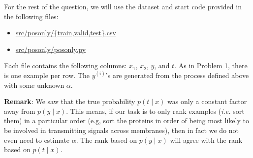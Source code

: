 For the rest of the question, we will use the dataset and start code provided in
the following files:
%
\begin{center}
\begin{itemize}
\item	\url{src/posonly/{train,valid,test}.csv}
\item   \url{src/posonly/posonly.py}
\end{itemize}
\end{center}
%
Each file contains the following columns: $x_1$, $x_2$, $y$, and $t$. As in
Problem 1, there is one example per row. The $y^{(i)}$'s are generated from the process defined above with some unknown $\alpha$.


\begin{enumerate}
        
        \ifnum{} {
	  
        }\fi

        
        \ifnum{} {
	  
        } \fi

        
        \ifnum{} {
	  
        } \fi

	
        \ifnum{} {
	  
        } \fi

	
        \ifnum{} {
	  
        } \fi

	
        \ifnum{} {
	  
        } \fi
\end{enumerate}

\textbf{Remark}: We saw that the true probability $p(t\mid x)$ was only a
constant factor away from $p(y\mid x)$. This means, if our task is to only rank
examples (\emph{i.e.} sort them) in a particular order (e.g, sort the proteins
in order of being most likely to be involved in transmitting signals across
membranes), then in fact we do not even need to estimate $\alpha$. The rank
based on $p(y\mid x)$ will agree with the rank based on $p(t\mid x)$.
